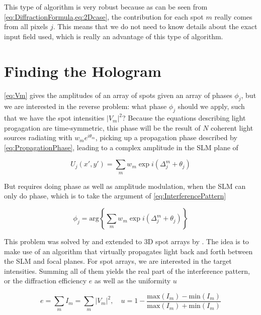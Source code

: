 This type of algorithm is very robust because as can be seen from \cref{eq:DiffractionFormula,eq:2Dcase}, the contribution for each spot $m$ really comes from all pixels $j$. 
This means that we do not need to know details about the exact input field used, which is really an advantage of this type of algorithm.

\section{Finding the Hologram}\label{sec:GSW}

\cref{eq:Vm} gives the amplitudes of an array of spots given an array of phases $\phi_j$, but we are interested in the reverse problem: what phase $\phi_j$ should we apply, such that we have the spot intensities $|V_m|^2$? 
Because the equations describing light progagation are time-symmetric, this phase will be the result of $N$ coherent light sources radiating with $w_m e^{i \theta_m}$, picking up a propagation phase described by \cref{eq:PropagationPhase}, leading to a complex amplitude in the \ac{SLM} plane of 

\begin{equation}\label{eq:InterferencePattern}
    U_j (x',y') = \sum_m w_m \exp{
    i\left(\Delta_j^m + \theta_j\right)
    }
\end{equation}

But requires doing phase as well as amplitude modulation, when the SLM can only do phase, which is to take the argument of \cref{eq:InterferencePattern}

\begin{equation}\label{eq:Argument}
    \phi_j = \text{arg}\left\{
     \sum_m w_m \exp{
    i\left(\Delta_j^m + \theta_j\right)
    }
    \right\}
\end{equation}

This problem was solved by \cite{Gerschberg1972} and extended to 3D spot arrays by \cite{DiLeonardo2007}. 
The idea is to make use of an algorithm that virtually propagates light back and forth between the SLM and focal planes.
For spot arrays, we are interested in the target intensities.
Summing all of them yields the real part of the interference pattern, or the diffraction efficiency $e$ as well as the uniformity $u$

\begin{equation}\label{eq:EfficiencyUniformity}
    e = \sum_m I_m = \sum_m |V_m|^2, 
    \quad 
    u = 1-\frac{\text{max}(I_m)-\text{min}(I_m)}{\text{max}(I_m)+\text{min}(I_m)}
\end{equation}

